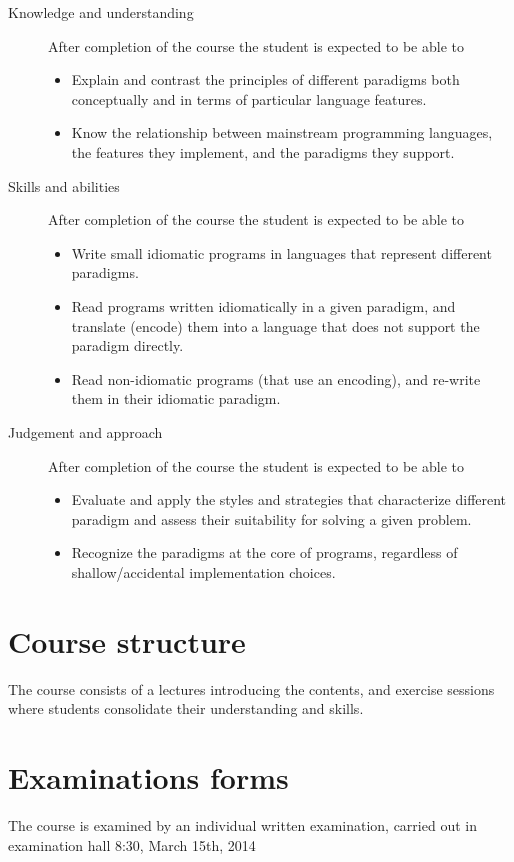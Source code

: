 \documentclass[oneside,11pt]{article}
\begin{document}
\begin{description}

\item[Knowledge and understanding]
    After completion of the course the student is expected to be able to
  \begin{itemize}
  \item Explain and contrast the principles of different paradigms both conceptually and in terms of particular language features.
  \item Know the relationship between mainstream programming languages, the features they implement, and the paradigms they support.
  \end{itemize}

\item[Skills and abilities]
    After completion of the course the student is expected to be able to
  \begin{itemize}
  \item Write small idiomatic programs in languages that represent different paradigms.
  \item Read programs written idiomatically in a given paradigm, and translate (encode) them into a language that does not support the paradigm directly.
  \item Read non-idiomatic programs (that use an encoding), and re-write them in their idiomatic paradigm.
  \end{itemize}

\item[Judgement and approach]
    After completion of the course the student is expected to be able to
  \begin{itemize}
  \item Evaluate and apply the styles and strategies that characterize different paradigm and assess their suitability for solving a given problem.
  \item Recognize the paradigms at the core of programs, regardless of shallow/accidental implementation choices. 
  \end{itemize}
\end{description}

\section*{Course structure}
The course consists of a lectures introducing the contents, and
exercise sessions where students consolidate their understanding and
skills.
\section*{Examinations forms}
The course is examined by an individual written examination, carried
out in examination hall 8:30, March 15th, 2014
\end{document}
